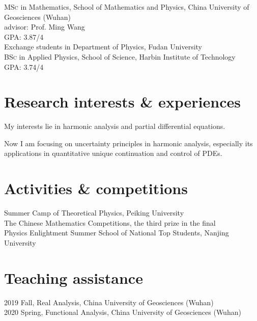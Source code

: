 \documentclass[11pt]{article} %
\begin{document}
\textsc{MSc} in Mathematics, School of Mathematics and Physics, China University of Geosciences (Wuhan)\\
advisor: Prof. Ming Wang\\
GPA: 3.87/4 \\
 Exchange students in Department of Physics,  Fudan University\\
\textsc{BSc} in Applied Physics, School of Science, Harbin Institute of Technology \\
GPA: 3.74/4 


\section*{Research interests \& experiences}
My interests lie in harmonic analysis and partial differential equations.

Now I am focusing on uncertainty principles in harmonic analysis, especially its applications in quantitative unique continuation and control of PDEs. 

\section*{Activities \& competitions}
 Summer Camp of Theoretical Physics, Peiking University\\
 The Chinese Mathematics Competitions, the third prize  in the final\\
 Physics Enlightment Summer School of National Top Students, Nanjing University


\section*{Teaching assistance}
2019 Fall, Real Analysis, China University of Geosciences (Wuhan) \\
2020 Spring, Functional Analysis, China University of Geosciences (Wuhan)
\end{document}
